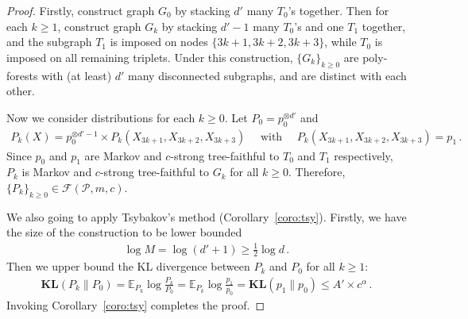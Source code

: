 \documentclass{article}
\theoremstyle{definition}
\theoremstyle{definition}
\theoremstyle{definition}
\theoremstyle{definition}
\theoremstyle{definition}
\theoremstyle{definition}
\theoremstyle{remark}
\theoremstyle{remark}
\newcommand{\E}{\mathbb{E}}
\newcommand{\dpdm}{m}
\newcommand{\dd}{d}
\newcommand{\pfclass}{\mathcal{F}}
\begin{document}
\begin{proof}
    Firstly, construct graph $G_0$ by stacking $\dd'$ many $T_0$'s together.
    Then for each $k\ge 1$, construct graph $G_k$ by stacking $\dd'-1$ many $T_0$'s and one $T_1$ together, and the subgraph $T_1$ is imposed on nodes $\{3k+1,3k+2,3k+3\}$, while $T_0$ is imposed on all remaining triplets.
    Under this construction, $\{G_k\}_{k\ge0}$ are poly-forests with (at least) $\dd'$ many disconnected subgraphs, and are distinct with each other.

    Now we consider distributions for each $k\ge 0$. Let $P_0 =p_0^{\otimes d'}$ and 
    \begin{align*}
        P_k(X) = p_0^{\otimes d'-1} \times P_k(X_{3k+1},X_{3k+2},X_{3k+3}) \quad \text{ with }\quad P_k(X_{3k+1},X_{3k+2},X_{3k+3}) = p_1\,.
    \end{align*}
    Since $p_0$ and $p_1$ are Markov and $c$-strong tree-faithful to $T_0$ and $T_1$ respectively, $P_k$ is Markov and $c$-strong tree-faithful to $G_k$ for all $k\ge 0$. Therefore, $\{P_k\}_{k\ge 0} \in \pfclass(\mathcal{P},\dpdm,c)$.
    

    
    We also going to apply Tsybakov's method (Corollary~\ref{coro:tsy}). Firstly, we have the size of the construction to be lower bounded
    \begin{align*}
        \log M = \log (\dd'+1) \ge \frac{1}{2}\log \dd \,.
    \end{align*}
    Then we upper bound the KL divergence between $P_k$ and $P_0$ for all $k\ge 1$:
    \begin{align*}
        \mathbf{KL}(P_k\|P_0) =\E_{P_k} \log \frac{P_k}{P_0} =\E_{P_k} \log \frac{p_1}{p_0} = \mathbf{KL}(p_1\|p_0) \le A'\times c^\alpha\,.
    \end{align*}
    Invoking Corollary~\ref{coro:tsy} completes the proof.
\end{proof}
\end{document}
